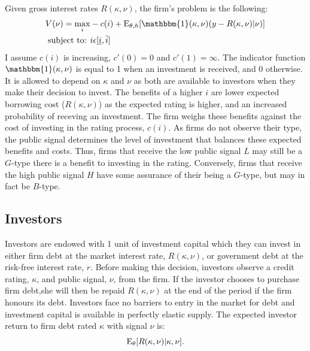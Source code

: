 \documentclass[notitlepage]{article}
\begin{document}
Given gross interest rates $R(\kappa,\nu)$, the firm's problem is the following:
\begin{align}
\label{eq:FP} V(\nu)=\max_{i} & -c(i)+\textup{E}_{\theta,h} [ \mathbbm{1}(\kappa,\nu) (y - R(\kappa,\nu)|\nu ) ]\\
\textup{subject to: } & i\epsilon [\underline{i},\bar{i}] \nonumber
\end{align}
I assume $c(i)$ is increasing, $c'(0)=0$ and $c'(1)=\infty$. The indicator function $\mathbbm{1}(\kappa,\nu)$ is equal to 1 when an investment is received, and 0 otherwise. It is allowed to depend on $\kappa$ and $\nu$ as both are available to investors when they make their decision to invest. The benefits of a higher $i$ are lower expected borrowing cost ($R(\kappa,\nu)$) as the expected rating is higher, and an increased probability of receving an investment. The firm weighs these benefits against the cost of investing in the rating process, $c(i)$. As firms do not observe their type, the public signal determines the level of investment that balances these expected benefits and costs. Thus, firms that receive the low public signal $L$ may still be a $G$-type there is a benefit to investing in the rating. Conversely, firms that receive the high public signal $H$ have some assurance of their being a $G$-type, but may in fact be $B$-type. 

\subsection{Investors}
Investors are endowed with 1 unit of investment capital which they can invest in either firm debt at the market interest rate, $R(\kappa,\nu)$, or government debt at the risk-free interest rate, $r$. Before making this decision, investors observe a credit rating, $\kappa$, and public signal, $\nu$, from the firm. If the investor chooses to purchase firm debt,she will then be repaid $R(\kappa,\nu)$ at the end of the period if the firm honours its debt. Investors face no barriers to entry in the market for debt and investment capital is available in perfectly elastic supply. The expected investor return to firm debt rated $\kappa$ with signal $\nu$ is:
\begin{equation}
\textup{E}_{\theta} [R(\kappa,\nu)|\kappa,\nu ].
\end{equation}
\end{document}
